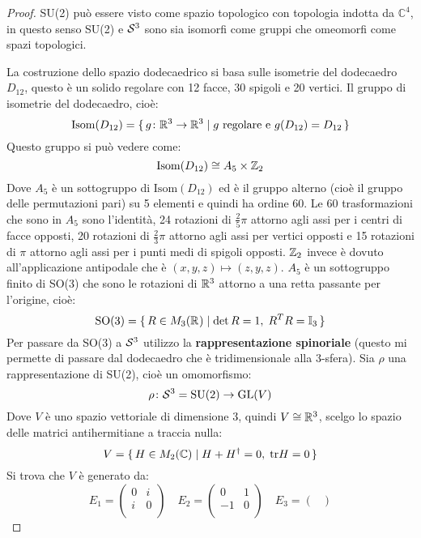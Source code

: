 \begin{proof}
  SU(2) può essere visto come spazio topologico con topologia indotta da $ \mathbb{C}^4 $,
  in questo senso SU(2) e $ \mathcal{S}^{3} $ sono sia isomorfi come gruppi che omeomorfi
  come spazi topologici.

  La costruzione dello spazio dodecaedrico si basa sulle isometrie del dodecaedro $ D_{12} $,
  questo è un solido regolare con 12 facce, 30 spigoli e 20 vertici.
  Il gruppo di isometrie del dodecaedro, cioè:
  \[
    \mathrm{Isom}(D_{12}) = \set{ g \colon \mathbb{R}^{3} \to \mathbb{R}^{3} | g \text{ regolare e } g(D_{12}) = D_{12}}
  \]
  Questo gruppo si può vedere come:
  \[
    \mathrm{Isom}(D_{12}) \cong A_5 \times \mathbb{Z}_2
  \]
  Dove $ A_5 $ è un sottogruppo di $ \mathrm{Isom}(D_{12}) $ ed è il gruppo
  alterno (cioè il gruppo delle permutazioni pari) su 5 elementi e quindi ha ordine 60.
  Le 60 trasformazioni che sono in $ A_5 $ sono l'identità, 24 rotazioni di $ \frac{2}{5} \pi $ attorno
  agli assi per i centri di facce opposti, 20 rotazioni di $ \frac{2}{3} \pi $ attorno
  agli assi per vertici opposti e 15 rotazioni di $ \pi $ attorno agli assi per
  i punti medi di spigoli opposti.
  $ \mathbb{Z}_2 $ invece è dovuto all'applicazione antipodale che è $ (x,y,z) \mapsto (z,y,z) $.
  $ A_5 $ è un sottogruppo finito di SO(3) che sono le rotazioni di $ \mathbb{R}^{3} $ attorno
  a una retta passante per l'origine, cioè:
  \[
    \mathrm{SO(3)} = \set{ R \in M_3(\mathbb{R}^{}) | \det{R} = 1, \;R^T R = \mathbb{I}_{3}}
  \]
  Per passare da SO(3) a $ \mathcal{S}^{3} $ utilizzo la \textbf{rappresentazione spinoriale}
  (questo mi permette di passare dal dodecaedro che è tridimensionale alla $ 3 $-sfera).
  Sia $ \rho $ una rappresentazione di SU(2), cioè un omomorfismo:
  \[
    \rho \colon \mathcal{S}^{3} = \mathrm{SU(2)} \to \mathrm{GL}(V)
  \]
  Dove $ V $ è uno spazio vettoriale di dimensione 3, quindi $ V \cong \mathbb{R}^{3} $, scelgo
  lo spazio delle matrici antihermitiane a traccia nulla:
  \[
    V = \set{H \in M_2(\mathbb{C}) | H + H^\dagger = 0, \; \mathrm{tr}H  = 0}
  \]
  Si trova che $ V $ è generato da:
  \[
    E_1 =
    \begin{pmatrix}
      0 & i \\
      i & 0 \\
    \end{pmatrix}
    \quad
    E_2 =
    \begin{pmatrix}
      0 & 1 \\
      -1 & 0 \\
    \end{pmatrix}
    \quad
    E_3 =
    \begin{pmatrix}

\end{pmatrix}\]
\end{proof}
